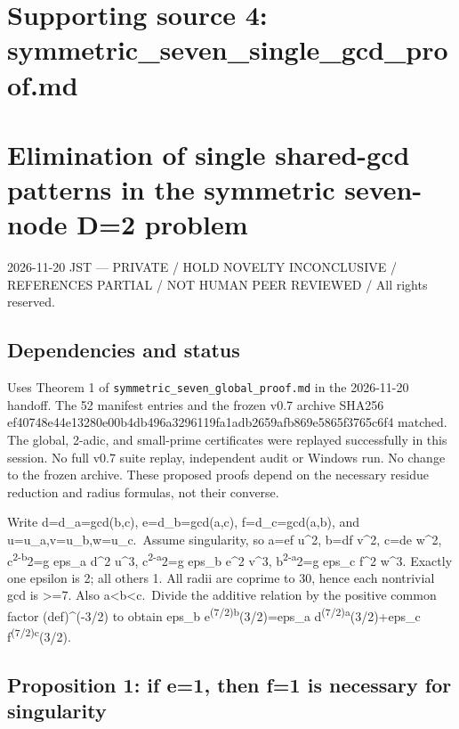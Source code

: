 \documentclass[
  10pt,
]{article}
\begin{document}
\newpage

\section{Supporting source 4:
symmetric\_seven\_single\_gcd\_proof.md}\label{supporting-source-4-symmetric_seven_single_gcd_proof.md}

\section{Elimination of single shared-gcd patterns in the symmetric
seven-node D=2
problem}\label{elimination-of-single-shared-gcd-patterns-in-the-symmetric-seven-node-d2-problem}

2026-11-20 JST --- PRIVATE / HOLD NOVELTY INCONCLUSIVE / REFERENCES
PARTIAL / NOT HUMAN PEER REVIEWED / All rights reserved.

\subsection{Dependencies and status}\label{dependencies-and-status}

Uses Theorem 1 of \texttt{symmetric\_seven\_global\_proof.md} in the
2026-11-20 handoff. The 52 manifest entries and the frozen v0.7 archive
SHA256 ef40748e44e13280e00b4db496a3296119fa1adb2659afb869e5865f3765c6f4
matched. The global, 2-adic, and small-prime certificates were replayed
successfully in this session. No full v0.7 suite replay, independent
audit or Windows run. No change to the frozen archive. These proposed
proofs depend on the necessary residue reduction and radius formulas,
not their converse.

Write d=d\_a=gcd(b,c), e=d\_b=gcd(a,c), f=d\_c=gcd(a,b), and
u=u\_a,v=u\_b,w=u\_c.~Assume singularity, so a=ef u\^{}2, b=df v\^{}2,
c=de w\^{}2, c\textsuperscript{2-b}2=g eps\_a d\^{}2 u\^{}3,
c\textsuperscript{2-a}2=g eps\_b e\^{}2 v\^{}3,
b\textsuperscript{2-a}2=g eps\_c f\^{}2 w\^{}3. Exactly one epsilon is
2; all others 1. All radii are coprime to 30, hence each nontrivial gcd
is \textgreater=7. Also a\textless b\textless c.~Divide the additive
relation by the positive common factor (def)\^{}(-3/2) to obtain eps\_b
e\textsuperscript{(7/2)b}(3/2)=eps\_a
d\textsuperscript{(7/2)a}(3/2)+eps\_c f\textsuperscript{(7/2)c}(3/2).

\subsection{Proposition 1: if e=1, then f=1 is necessary for
singularity}\label{proposition-1-if-e1-then-f1-is-necessary-for-singularity}
\end{document}
